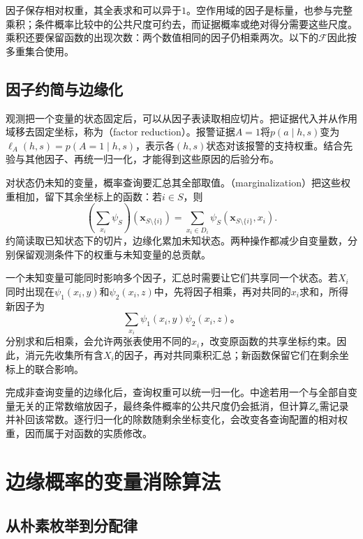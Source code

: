因子保存相对权重，其全表求和可以异于$1$。空作用域的因子是标量，也参与完整乘积；条件概率比较中的公共尺度可约去，而证据概率或绝对得分需要这些尺度。乘积还要保留函数的出现次数：两个数值相同的因子仍相乘两次。以下的$\mathcal{F}$因此按多重集合使用。

\subsection{因子约简与边缘化}
\label{sec:pgm-elimination-reduction-marginalization}

观测把一个变量的状态固定后，可以从因子表读取相应切片。把证据代入并从作用域移去固定坐标，称为（factor reduction）。报警证据$A=1$将$p(a\mid h,s)$变为$\ell_A(h,s)=p(A=1\mid h,s)$，表示各$(h,s)$状态对该报警的支持权重。结合先验与其他因子、再统一归一化，才能得到这些原因的后验分布。

对状态仍未知的变量，概率查询要汇总其全部取值。（marginalization）把这些权重相加，留下其余坐标上的函数：若$i\in S$，则
\begin{equation}
  (\mathop{\textstyle\sum}_{x_i}\psi_S)
    (\bm{x}_{S\setminus\{i\}})
  =\sum_{x_i\in D_i}\psi_S(\bm{x}_{S\setminus\{i\}},x_i).
  \label{eq:pgm-elimination-factor-marginal}
\end{equation}
约简读取已知状态下的切片，边缘化累加未知状态。两种操作都减少自变量数，分别保留观测条件下的权重与未知变量的总贡献。

一个未知变量可能同时影响多个因子，汇总时需要让它们共享同一个状态。若$X_i$同时出现在$\psi_1(x_i,y)$和$\psi_2(x_i,z)$中，先将因子相乘，再对共同的$x_i$求和，所得新因子为
\[
  \sum_{x_i}\psi_1(x_i,y)\psi_2(x_i,z)\text{。}
\]
分别求和后相乘，会允许两张表使用不同的$x_i$，改变原函数的共享坐标约束。因此，消元先收集所有含$X_i$的因子，再对共同乘积汇总；新函数保留它们在剩余坐标上的联合影响。

完成非查询变量的边缘化后，查询权重可以统一归一化。中途若用一个与全部自变量无关的正常数缩放因子，最终条件概率的公共尺度仍会抵消，但计算$Z_{\bm{e}}$需记录并补回该常数。逐行归一化的除数随剩余坐标变化，会改变各查询配置的相对权重，因而属于对函数的实质修改。

\section{边缘概率的变量消除算法}
\label{sec:pgm-elimination-sum-product}

\subsection{从朴素枚举到分配律}
\label{sec:pgm-elimination-distributivity}


